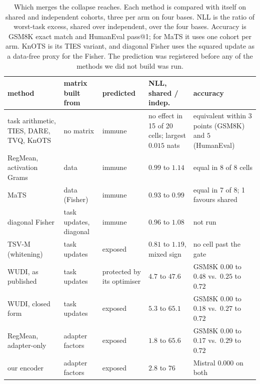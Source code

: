 \begin{table}[pos=tbp]
\centering
\small
\caption{Which merges the collapse reaches. Each method is compared with itself
on shared and independent cohorts, three per arm on four bases. NLL is the
ratio of worst-task excess, shared over independent, over the four bases.
Accuracy is GSM8K exact match and HumanEval pass@1; for MaTS it uses one cohort
per arm. KnOTS is its TIES variant, and diagonal Fisher uses the squared update
as a data-free proxy for the Fisher. The prediction was registered before any
of the methods we did not build was run.}
\label{tab:exposure}
\setlength{\tabcolsep}{3.5pt}
\begin{tabularx}{\textwidth}{>{\raggedright\arraybackslash}p{2.5cm}
                >{\raggedright\arraybackslash}p{1.7cm}
                >{\raggedright\arraybackslash}p{1.5cm}
                >{\raggedright\arraybackslash}X
                >{\raggedright\arraybackslash}X}
\toprule
method & matrix built from & predicted & NLL, shared / indep. & accuracy \\
\midrule
task arithmetic, TIES, DARE, TVQ, KnOTS & no matrix & immune
  & no effect in 15 of 20 cells; largest $0.015$ nats
  & equivalent within $3$ points (GSM8K) and $5$ (HumanEval) \\
\addlinespace
RegMean, activation Grams & data & immune & $0.99$ to $1.14$
  & equal in 8 of 8 cells \\
MaTS & data (Fisher) & immune & $0.93$ to $0.99$
  & equal in 7 of 8; 1 favours shared \\
diagonal Fisher & task updates, diagonal & immune & $0.96$ to $1.08$ & not run \\
\addlinespace
TSV-M (whitening) & task updates & exposed & $0.81$ to $1.19$, mixed sign
  & no cell past the gate \\
\addlinespace
WUDI, as published & task updates & protected by its optimiser & $4.7$ to $47.6$
  & GSM8K $0.00$ to $0.48$ vs.\ $0.25$ to $0.72$ \\
WUDI, closed form & task updates & exposed & $5.3$ to $65.1$
  & GSM8K $0.00$ to $0.18$ vs.\ $0.27$ to $0.72$ \\
\addlinespace
RegMean, adapter-only & adapter factors & exposed & $1.8$ to $65.6$
  & GSM8K $0.00$ to $0.17$ vs.\ $0.29$ to $0.72$ \\
our encoder & adapter factors & exposed & $2.8$ to $76$
  & Mistral $0.000$ on both \\
\bottomrule
\end{tabularx}
\end{table}

